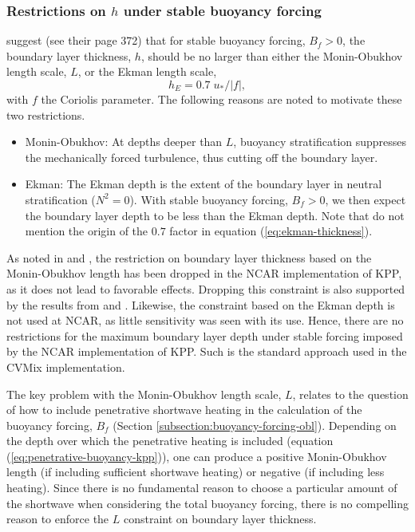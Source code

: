 \subsubsection{Restrictions on $h$ under stable buoyancy forcing}

\cite{LargeKPP} suggest (see their page 372) that for stable buoyancy
forcing, $B_{f} > 0$, the boundary layer thickness, $h$, should be no
larger than either the Monin-Obukhov length scale, $L$, or the Ekman
length scale,
\begin{equation}
 h_{E} = 0.7 \; u_{*} /|f|,
\label{eq:ekman-thickness}
\end{equation} 
with $f$ the Coriolis parameter.  The following reasons are noted to
motivate these two restrictions.
\begin{itemize}
\item {\sc Monin-Obukhov}: At depths deeper than $L$, buoyancy
  stratification suppresses the mechanically forced turbulence, thus
  cutting off the boundary layer.

  \item {\sc Ekman}: The Ekman depth is the extent of the boundary
    layer in neutral stratification ($N^{2} = 0$).  With stable
    buoyancy forcing, $B_{f} > 0$, we then expect the boundary layer
    depth to be less than the Ekman depth.  Note that \cite{LargeKPP}
    do not mention the origin of the $0.7$ factor in equation
    (\ref{eq:ekman-thickness}).

\end{itemize}

As noted in \cite{LargeKPP} and \cite{Large_Gent1999}, the restriction
on boundary layer thickness based on the Monin-Obukhov length has been
dropped in the NCAR implementation of KPP, as it does not lead to
favorable effects.  Dropping this constraint is also supported by the
results from \cite{Shchepetkin2005} and \cite{Lemarie_etal2012a}.
Likewise, the constraint based on the Ekman depth is not used at NCAR,
as little sensitivity was seen with its use.  Hence, there are no
restrictions for the maximum boundary layer depth under stable forcing
imposed by the NCAR implementation of KPP.  Such is the standard
approach used in the CVMix implementation.

The key problem with the Monin-Obukhov length scale, $L$, relates to
the question of how to include penetrative shortwave heating in the
calculation of the buoyancy forcing, $B_{f}$ (Section
\ref{subsection:buoyancy-forcing-obl}).  Depending on the depth over
which the penetrative heating is included (equation
(\ref{eq:penetrative-buoyancy-kpp})), one can produce a positive
Monin-Obukhov length (if including sufficient shortwave heating) or
negative (if including less heating). Since there is no fundamental
reason to choose a particular amount of the shortwave when considering
the total buoyancy forcing, there is no compelling reason to enforce
the $L$ constraint on boundary layer thickness.


